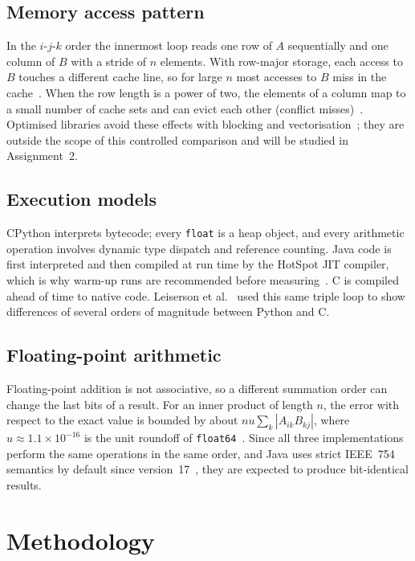 \documentclass[12pt,a4paper]{report}
\begin{document}
\section{Memory access pattern}

In the $i$-$j$-$k$ order the innermost loop reads one row of $A$ sequentially and one column of $B$ with a stride of
$n$ elements. With row-major storage, each access to $B$ touches a different cache line, so for large $n$ most
accesses to $B$ miss in the cache~\cite{drepper2007,hennessy2017,lam1991}. When the row length is a power of two, the
elements of a column map to a small number of cache sets and can evict each other (conflict
misses)~\cite{drepper2007,lam1991}. Optimised libraries avoid these effects with blocking and
vectorisation~\cite{goto2008}; they are outside the scope of this controlled comparison and will be studied in
Assignment~2.

\section{Execution models}

CPython interprets bytecode; every \texttt{float} is a heap object, and every arithmetic operation involves dynamic
type dispatch and reference counting. Java code is first interpreted and then compiled at run time by the HotSpot JIT
compiler, which is why warm-up runs are recommended before measuring~\cite{georges2007}. C is compiled ahead of time
to native code. Leiserson et al.~\cite{leiserson2020} used this same triple loop to show differences of several orders
of magnitude between Python and C.

\section{Floating-point arithmetic}

Floating-point addition is not associative, so a different summation order can change the last bits of a result. For
an inner product of length $n$, the error with respect to the exact value is bounded by about
$n u \sum_k |A_{ik} B_{kj}|$, where $u \approx 1.1 \times 10^{-16}$ is the unit roundoff of
\texttt{float64}~\cite{higham2002}. Since all three implementations perform the same operations in the same order,
and Java uses strict IEEE~754 semantics by default since version~17~\cite{jep306}, they are expected to produce
bit-identical results.

\chapter{Methodology}
\label{chap:method}
\end{document}
